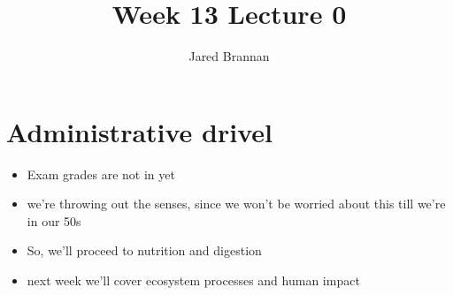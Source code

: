 \documentclass{article}
\title{Week 13 Lecture 0}
\author{Jared Brannan }
\theoremstyle{definition}
\begin{document}
\maketitle

\section{Administrative drivel}
\begin{itemize}
	\item Exam grades are not in yet
	\item we're throwing out the senses, since we won't be worried about this  till we're in our 50s
	\item So, we'll proceed to nutrition and digestion
	\item next week we'll cover ecosystem processes and human impact
\end{itemize}
\end{document}
